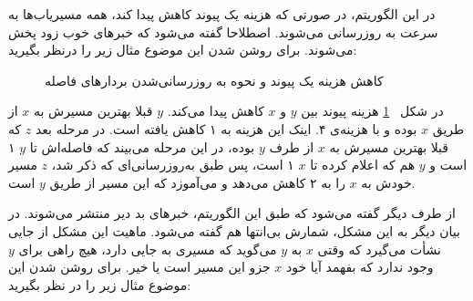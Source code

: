   در این الگوریتم، در صورتی که هزینه یک پیوند کاهش پیدا کند، همه مسیریاب‌ها به سرعت به روزرسانی می‌شوند. اصطلاحا گفته می‌شود که خبرهای خوب زود پخش می‌شوند. برای روشن شدن این موضوع مثال زیر را درنظر بگیرید:
  

 \begin{figure}[H]
\centering
{}
\caption{کاهش هزینه یک پیوند و نحوه به روزرسانی‌شدن بردار‌های فاصله}
\label{fig:goodnews}
\end{figure}
 

 در شکل 
 ~\ref{fig:goodnews}
 هزینه پیوند بین $y$ و $x$ کاهش پیدا می‌کند. $y$ قبلا بهترین مسیرش به $x$ از طریق $x$ بوده و با هزینه‌ی ۴. اینک این هزینه به ۱ کاهش یافته است. در مرحله بعد $z$ که قبلا بهترین مسیرش به $x$ از طرف $y$ بوده، در این مرحله می‌بیند که فاصله‌اش تا $y$ ۱ است و $y$ هم که اعلام کرده تا $x$ ۱ است، پس طبق به‌روزرسانی‌ای که ذکر شد، $z$  مسیر خودش به $x$ را به ۲ کاهش می‌دهد و می‌آموزد که این مسیر از طریق $y$ است. 
 
 از طرف دیگر گفته می‌شود که طبق این الگوریتم، خبرهای بد دیر منتشر می‌شوند. در بیان دیگر به این مشکل، شمارش بی‌انتها هم گفته می‌شود. ماهیت این مشکل از جایی نشأت می‌گیرد که وقتی $x$ به $y$ می‌گوید که مسیری به جایی دارد، هیچ راهی برای $y$ وجود ندارد که بفهمد آیا خود $x$ جزو این مسیر است یا خیر. برای روشن شدن این موضوع مثال زیر را در نظر بگیرید: 
 
